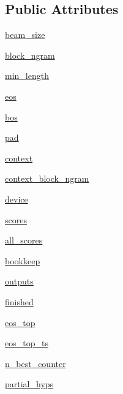\subsection*{Public Attributes}
\begin{DoxyCompactItemize}
\item 
\hyperlink{classparlai_1_1core_1_1torch__generator__agent_1_1TreeSearch_a2381c33e5233a5f5c1e50c65ab0ee572}{beam\+\_\+size}
\item 
\hyperlink{classparlai_1_1core_1_1torch__generator__agent_1_1TreeSearch_a6b27ba18a5e343345ab7319f2ead843d}{block\+\_\+ngram}
\item 
\hyperlink{classparlai_1_1core_1_1torch__generator__agent_1_1TreeSearch_a71d6802f40cf025cd5c0242070d78b62}{min\+\_\+length}
\item 
\hyperlink{classparlai_1_1core_1_1torch__generator__agent_1_1TreeSearch_a51a1164086e9033c942b3c7ab3d6a194}{eos}
\item 
\hyperlink{classparlai_1_1core_1_1torch__generator__agent_1_1TreeSearch_aaef8214c017d387336317a37f395df3c}{bos}
\item 
\hyperlink{classparlai_1_1core_1_1torch__generator__agent_1_1TreeSearch_aa00f03954e2bf737b13d1b43a609fb00}{pad}
\item 
\hyperlink{classparlai_1_1core_1_1torch__generator__agent_1_1TreeSearch_a6617873218cb0975d7e5f04f09379ac6}{context}
\item 
\hyperlink{classparlai_1_1core_1_1torch__generator__agent_1_1TreeSearch_ab1411b1cb22d74f4682213c487d23898}{context\+\_\+block\+\_\+ngram}
\item 
\hyperlink{classparlai_1_1core_1_1torch__generator__agent_1_1TreeSearch_a37b3f7f827909e3aa2d8e35c32c41e81}{device}
\item 
\hyperlink{classparlai_1_1core_1_1torch__generator__agent_1_1TreeSearch_a07cf31c1808301e5b4d1d0ef128c5948}{scores}
\item 
\hyperlink{classparlai_1_1core_1_1torch__generator__agent_1_1TreeSearch_ac9e79a3effa48d2e35ac879620cd639e}{all\+\_\+scores}
\item 
\hyperlink{classparlai_1_1core_1_1torch__generator__agent_1_1TreeSearch_a1f1f3da5f6079f5043d28e72b2a6fdfa}{bookkeep}
\item 
\hyperlink{classparlai_1_1core_1_1torch__generator__agent_1_1TreeSearch_aae65afe3c0c8855e9a54ba44bf7209ce}{outputs}
\item 
\hyperlink{classparlai_1_1core_1_1torch__generator__agent_1_1TreeSearch_ab2d79d6023881123b8960356243692d9}{finished}
\item 
\hyperlink{classparlai_1_1core_1_1torch__generator__agent_1_1TreeSearch_a5b7078c44965d7a9d54250149d164c8f}{eos\+\_\+top}
\item 
\hyperlink{classparlai_1_1core_1_1torch__generator__agent_1_1TreeSearch_a0a1eb3fae74a9b2edbb54cc4162878af}{eos\+\_\+top\+\_\+ts}
\item 
\hyperlink{classparlai_1_1core_1_1torch__generator__agent_1_1TreeSearch_a2b64a54420c470d50e389cdaacde4933}{n\+\_\+best\+\_\+counter}
\item 
\hyperlink{classparlai_1_1core_1_1torch__generator__agent_1_1TreeSearch_a159f5589fdfea9a040c4c1ca5c14ea2c}{partial\+\_\+hyps}
\end{DoxyCompactItemize}

